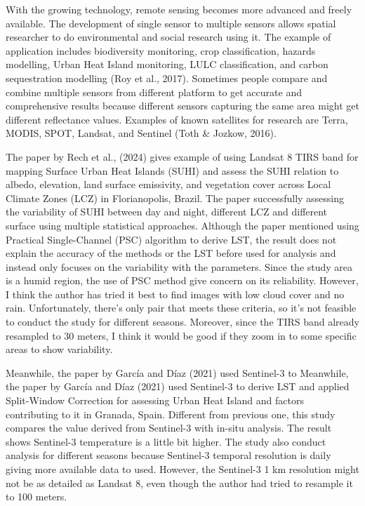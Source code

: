 \documentclass[
  letterpaper,
  DIV=11,
  numbers=noendperiod]{scrreprt}
\begin{document}
With the growing technology, remote sensing becomes more advanced and
freely available. The development of single sensor to multiple sensors
allows spatial researcher to do environmental and social research using
it. The example of application includes biodiversity monitoring, crop
classification, hazards modelling, Urban Heat Island monitoring, LULC
classification, and carbon sequestration modelling (Roy et al., 2017).
Sometimes people compare and combine multiple sensors from different
platform to get accurate and comprehensive results because different
sensors capturing the same area might get different reflectance values.
Examples of known satellites for research are Terra, MODIS, SPOT,
Landsat, and Sentinel (Toth \& Jozkow, 2016).

The paper by Rech et al., (2024) gives example of using Landsat 8 TIRS
band for mapping Surface Urban Heat Islands (SUHI) and assess the SUHI
relation to albedo, elevation, land surface emissivity, and vegetation
cover across Local Climate Zones (LCZ) in Florianopolis, Brazil. The
paper successfully assessing the variability of SUHI between day and
night, different LCZ and different surface using multiple statistical
approaches. Although the paper mentioned using Practical Single-Channel
(PSC) algorithm to derive LST, the result does not explain the accuracy
of the methods or the LST before used for analysis and instead only
focuses on the variability with the parameters. Since the study area is
a humid region, the use of PSC method give concern on its reliability.
However, I think the author has tried it best to find images with low
cloud cover and no rain. Unfortunately, there's only pair that meets
these criteria, so it's not feasible to conduct the study for different
seasons. Moreover, since the TIRS band already resampled to 30 meters, I
think it would be good if they zoom in to some specific areas to show
variability.

Meanwhile, the paper by García and Díaz (2021) used Sentinel-3 to
Meanwhile, the paper by García and Díaz (2021) used Sentinel-3 to derive
LST and applied Split-Window Correction for assessing Urban Heat Island
and factors contributing to it in Granada, Spain. Different from
previous one, this study compares the value derived from Sentinel-3 with
in-situ analysis. The result shows Sentinel-3 temperature is a little
bit higher. The study also conduct analysis for different seasons
because Sentinel-3 temporal resolution is daily giving more available
data to used. However, the Sentinel-3 1 km resolution might not be as
detailed as Landsat 8, even though the author had tried to resample it
to 100 meters.
\end{document}
